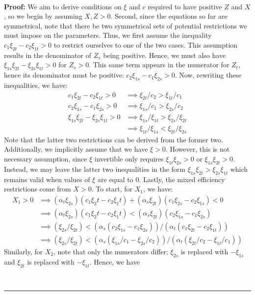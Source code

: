 \documentclass[11pt,a4paper,leqno]{extarticle}
\newenvironment{proof}[1][Proof]{\noindent\textbf{#1:} }{\ \rule{0.5em}{0.5em}}
\begin{document}
	\hfill\\
	\begin{proof}
		We aim to derive conditions on $\xi$ and $c$ required to have positive $Z$ and $X$, so we begin by assuming $X, Z  > 0$. Second, since the equations so far are symmetrical, note that there be two symmetrical sets of potential restrictions we must impose on the parameters. Thus, we first assume the inequality $c_1 \xi_{2t} - c_2 \xi_{1t} > 0$ to restrict ourselves to one of the two cases. This assumption results in the denominator of $Z_s$ being positive. Hence, we must also have $\xi_{1s}\xi_{2t} - \xi_{2s}\xi_{1t} > 0 $ for $Z_s > 0$. This same term appears in the numerator for $Z_t$, hence its denominator must be positive: $c_2 \xi_{1s} - c_1 \xi_{2s} > 0$. Now, rewriting these inequalities, we have:
		\begin{align*}
		c_1 \xi_{2t} - c_2 \xi_{1t} > 0 &\implies \xi_{2t}/c_2 > \xi_{1t}/c_1 \\
		c_2 \xi_{1s} - c_1 \xi_{2s} > 0 &\implies \xi_{1s}/c_1 > \xi_{2s}/c_2 \\
		\xi_{1s}\xi_{2t} - \xi_{2s}\xi_{1t} > 0 &\implies \xi_{1s}/\xi_{1t} > \xi_{2s}/\xi_{2t} \\
		&\implies \xi_{1t}/\xi_{1s} < \xi_{2t}/\xi_{2s} 
		\end{align*}
		Note that the latter two restrictions can be derived from the former two. Additionally, we implicitly assume that we have $\xi > 0$. However, this is not necessary assumption, since $\xi$ invertible only requires $\xi_{1t} \xi_{2s} > 0$ or $\xi_{1s} \xi_{2t} > 0$. Instead, we may leave the latter two inequalities in the form $ \xi_{1s}\xi_{2t} > \xi_{2s}\xi_{1t}$ which remains valid when values of $\xi$ are equal to $0$. Lastly, the mixed efficiency restrictions come from $X > 0$. To start, for $X_1$, we have:
		\begin{align*}
		X_1 > 0 &\implies (\alpha_t \xi_{2s})(c_1 \xi_2t - c_2\xi_1t) + (\alpha_s \xi_{2t})(c_1 \xi_{2s} - c_2 \xi_{1s}) < 0\\
		&\implies (\alpha_t \xi_{2s})(c_1 \xi_2t - c_2\xi_1t) < (\alpha_s \xi_{2t})(c_2 \xi_{1s} - c_1 \xi_{2s}) \\
		&\implies (\xi_{2s}/\xi_{2t}) < (\alpha_s (c_2 \xi_{1s} - c_1 \xi_{2s}))/(\alpha_t(c_1 \xi_{2t} - c_2\xi_{1t})) \\
		&\implies (\xi_{2s}/\xi_{2t}) < (\alpha_s (\xi_{1s}/c_1 -  \xi_{2s}/c_2))/(\alpha_t(\xi_{2t}/c_2 - \xi_{1t}/c_1)) 
		\end{align*}
		Similarly, for $X_2$, note that only the numerators differ; $\xi_{2s}$ is replaced with $-\xi_{1s}$ and $\xi_{2t}$ is replaced with $-\xi_{1t}$. Hence, we have

\end{proof}
\end{document}
